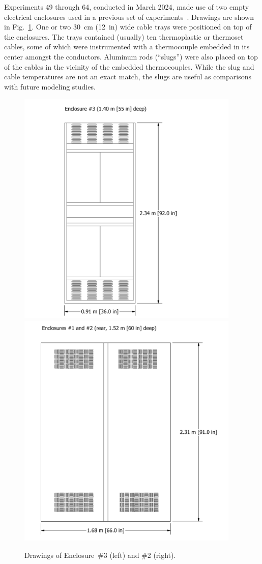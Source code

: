 Experiments 49 through 64, conducted in March 2024, made use of two empty electrical enclosures used in a previous set of experiments~\cite{OLIVE-FIRE}. Drawings are shown in Fig.~\ref{fig:enclosure_drawings}. One or two 30~cm (12~in) wide cable trays were positioned on top of the enclosures. The trays contained (usually) ten thermoplastic or thermoset cables, some of which were instrumented with a thermocouple embedded in its center amongst the conductors. Aluminum rods (``slugs'') were also placed on top of the cables in the vicinity of the embedded thermocouples. While the slug and cable temperatures are not an exact match, the slugs are useful as comparisons with future modeling studies.
\begin{figure}[!ht]
\hspace*{-0.75in}\includegraphics[height=4.5in]{../FIGURES/Cabinet_3}
\hspace*{-1.25in}\includegraphics[height=4.5in]{../FIGURES/Cabinet_1}
\caption[Drawings of Enclosures \#2 and \#3]{Drawings of Enclosure~\#3 (left) and \#2 (right).}
\label{fig:enclosure_drawings}
\end{figure}
